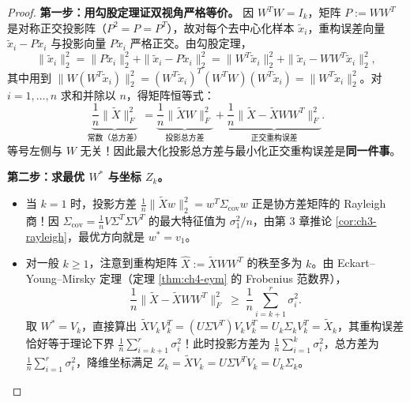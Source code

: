 \begin{proof}
\textbf{第一步：用勾股定理证双视角严格等价。}
因 $W^T W = I_k$，矩阵 $P := W W^T$ 是对称正交投影阵（$P^2 = P = P^T$），故对每个去中心化样本 $\tilde{x}_i$，重构误差向量 $\tilde{x}_i - P\tilde{x}_i$ 与投影向量 $P\tilde{x}_i$ 严格正交。由勾股定理，
\[
  \|\tilde{x}_i\|_2^2 = \|P\tilde{x}_i\|_2^2 + \|\tilde{x}_i - P\tilde{x}_i\|_2^2
  = \|W^T \tilde{x}_i\|_2^2 + \|\tilde{x}_i - W W^T \tilde{x}_i\|_2^2,
\]
其中用到 $\|W(W^T\tilde{x}_i)\|_2^2 = (W^T\tilde{x}_i)^T (W^T W)(W^T\tilde{x}_i) = \|W^T\tilde{x}_i\|_2^2$。对 $i = 1, \dots, n$ 求和并除以 $n$，得矩阵恒等式：
\begin{equation}
  \underbrace{\frac{1}{n}\|\widetilde{X}\|_F^2}_{\text{常数（总方差）}}
  = \underbrace{\frac{1}{n}\|\widetilde{X} W\|_F^2}_{\text{投影总方差}}
  + \underbrace{\frac{1}{n}\|\widetilde{X} - \widetilde{X} W W^T\|_F^2}_{\text{正交重构误差}}. \label{eq:ch4-pca-pythag}
\end{equation}
等号左侧与 $W$ 无关！因此最大化投影总方差与最小化正交重构误差是\textbf{同一件事}。

\textbf{第二步：求最优 $W^*$ 与坐标 $Z_k$。}
\begin{itemize}
  \item 当 $k = 1$ 时，投影方差 $\frac{1}{n}\|\widetilde{X}w\|_2^2 = w^T \Sigma_{\mathrm{cov}} w$ 正是协方差矩阵的 Rayleigh 商！因 $\Sigma_{\mathrm{cov}} = \frac{1}{n} V \Sigma^T \Sigma V^T$ 的最大特征值为 $\sigma_1^2/n$，由第 3 章推论 \ref{cor:ch3-rayleigh}，最优方向就是 $w^* = v_1$。
  \item 对一般 $k \ge 1$，注意到重构矩阵 $\widehat{X} := \widetilde{X} W W^T$ 的秩至多为 $k$。由 Eckart--Young--Mirsky 定理（定理 \ref{thm:ch4-eym} 的 Frobenius 范数界），
  \[
    \frac{1}{n}\|\widetilde{X} - \widetilde{X} W W^T\|_F^2 \;\ge\; \frac{1}{n}\sum_{i=k+1}^r \sigma_i^2.
  \]
  取 $W^* = V_k$，直接算出 $\widetilde{X} V_k V_k^T = (U\Sigma V^T) V_k V_k^T = U_k \Sigma_k V_k^T = \widetilde{X}_k$，其重构误差恰好等于理论下界 $\frac{1}{n}\sum_{i=k+1}^r \sigma_i^2$！此时投影方差为 $\frac{1}{n}\sum_{i=1}^k \sigma_i^2$，总方差为 $\frac{1}{n}\sum_{i=1}^r \sigma_i^2$，降维坐标满足 $Z_k = \widetilde{X} V_k = U\Sigma V^T V_k = U_k \Sigma_k$。
\end{itemize}
\end{proof}


